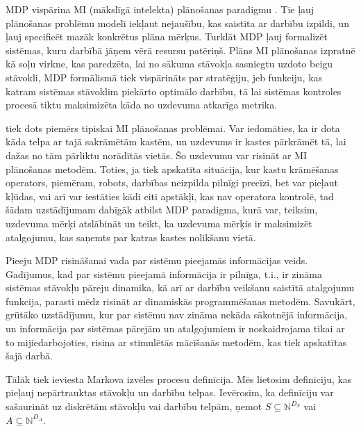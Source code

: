 \documentclass{ludis} %
\begin{document}
MDP vispārina MI (mākslīgā intelekta) plānošanas paradigmu
\autocite{Hendler1990ai}. Tie ļauj plānošanas problēmu modelī iekļaut nejaušību,
kas saistīta ar darbību izpildi, un ļauj specificēt mazāk konkrētus plāna
mērķus. Turklāt MDP ļauj formalizēt sistēmas, kuru darbībā jāņem vērā resursu
patēriņš. Plāns MI plānošanas izpratnē kā soļu virkne, kas paredzēta, lai no
sākuma stāvokļa sasniegtu uzdoto beigu stāvokli, MDP formālismā tiek vispārināts
par stratēģiju, jeb funkciju, kas katram sistēmas stāvoklim piekārto optimālo
darbību, tā lai sistēmas kontroles procesā tiktu maksimizēta kāda no uzdevuma
atkarīga metrika.

\autocite{Otterlo} tiek dots piemērs tipiskai MI plānošanas problēmai. Var
iedomāties, ka ir dota kāda telpa ar tajā sakrāmētām kastēm, un uzdevums ir
kastes pārkrāmēt tā, lai dažas no tām pārliktu norādītās vietās. Šo uzdevumu var
risināt ar MI plānošanas metodēm. Toties, ja tiek apskatīta situācija, kur kastu
krāmēšanas operators, piemēram, robots, darbības neizpilda pilnīgi precīzi, bet
var pieļaut kļūdas, vai arī var iestāties kādi citi apstākļi, kas nav operatora
kontrolē, tad šādam uzstādījumam dabīgāk atbilst MDP paradigma, kurā var,
teiksim, uzdevuma mērķi atslābināt un teikt, ka uzdevuma mērķis ir maksimizēt
atalgojumu, kas saņemts par katras kastes nolikšanu vietā.

Pieeju MDP risināšanai vada par sistēmu pieejamās informācijas veids. Gadījumus,
kad par sistēmu pieejamā informācija ir pilnīga, t.i., ir zināma sistēmas
stāvokļu pāreju dinamika, kā arī ar darbību veikšanu saistītā atalgojumu
funkcija, parasti mēdz risināt ar dinamiskās programmēšanas metodēm. Savukārt,
grūtāko uzstādījumu, kur par sistēmu nav zināma nekāda sākotnējā informācija, un
informācija par sistēmas pārejām un atalgojumiem ir noskaidrojama tikai ar to
mijiedarbojoties, risina ar stimulētās mācīšanās metodēm, kas tiek apskatītas
šajā darbā.

Tālāk tiek ieviesta Markova izvēles procesu definīcija. Mēs lietosim definīciju,
kas pieļauj nepārtrauktas stāvokļu un darbību telpas. Ievērosim, ka definīciju
var sašaurināt uz diskrētām stāvokļu vai darbību telpām, ņemot $S \subseteq
\mathbb{N}^{D_S}$ vai $A \subseteq \mathbb{N}^{D_A}$.
\end{document}
